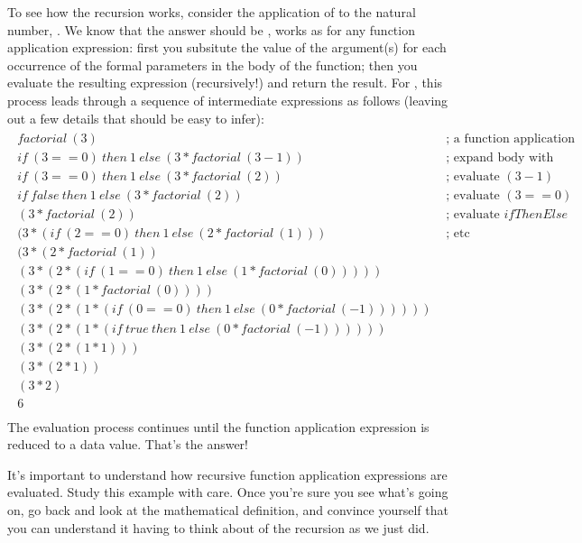 \documentclass[letterpaper,10pt,english]{sphinxmanual}
\begin{document}
To see how the recursion works, consider the application of
 to the natural number, . We know that the answer should
be , works as for
any function application expression: first you subsitute the value of
the argument(s) for each occurrence of the formal parameters in the
body of the function; then you evaluate the resulting expression
(recursively!) and return the result. For , this process
leads through a sequence of intermediate expressions as follows (leaving
out a few details that should be easy to infer):
\begin{align*}\!\begin{aligned}
factorial\ (3) & \text{ ; a function application expression}\\
if\ (3 == 0)\ then\ 1\ else\ (3 * factorial\ (3-1)) & \text{ ; expand body with  parameter/argument substitution}\\
if\ (3 == 0)\ then\ 1\ else\ (3 * factorial\ (2))  & \text{ ; evaluate $(3-1)$}\\
if\ false\ then\ 1\ else\ (3 * factorial\ (2)) & \text{ ; evaluate $(3==0)$ }\\
(3 * factorial\ (2)) & \text{ ; evaluate $ifThenElse$ }\\
(3 * (if\ (2==0)\ then\ 1\ else\ (2 * factorial\ (1))) & \text{ ; etc }\\
(3 * (2 * factorial\ (1))\\
(3 * (2 * (if\ (1==0)\ then\ 1\ else\ (1 * factorial\ (0)))))\\
(3 * (2 * (1 * factorial\ (0))))\\
(3 * (2 * (1 * (if\ (0==0)\ then\ 1\ else\ (0 * factorial\ (-1))))))\\
(3 * (2 * (1 * (if\ true\ then\ 1\ else\ (0 * factorial\ (-1))))))\\
(3 * (2 * (1 * 1)))\\
(3 * (2 * 1))\\
(3 * 2)\\
6\\
\end{aligned}\end{align*}
The evaluation process continues until the function application expression
is reduced to a data value. That’s the answer!

It’s important to understand how recursive function application
expressions are evaluated. Study this example with care. Once you’re
sure you see what’s going on, go back and look at the mathematical
definition, and convince yourself that you can understand it 
having to think about  of the recursion as we just did.
\end{document}

